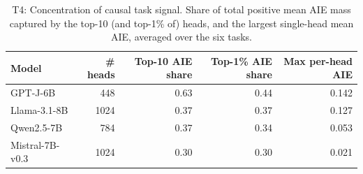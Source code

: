\begin{table}[t]
\centering
\small
\begin{tabular}{lrrrr}
\toprule
Model & \# heads & Top-10 AIE share & Top-1\% AIE share & Max per-head AIE \\
\midrule
GPT-J-6B & 448 & 0.63 & 0.44 & 0.142 \\
Llama-3.1-8B & 1024 & 0.37 & 0.37 & 0.127 \\
Qwen2.5-7B & 784 & 0.37 & 0.34 & 0.053 \\
Mistral-7B-v0.3 & 1024 & 0.30 & 0.30 & 0.021 \\
\bottomrule
\end{tabular}
\caption{T4: Concentration of causal task signal. Share of total positive mean AIE mass captured by the top-10 (and top-1\% of) heads, and the largest single-head mean AIE, averaged over the six tasks.}
\label{tab:T4_aie_concentration}
\end{table}
